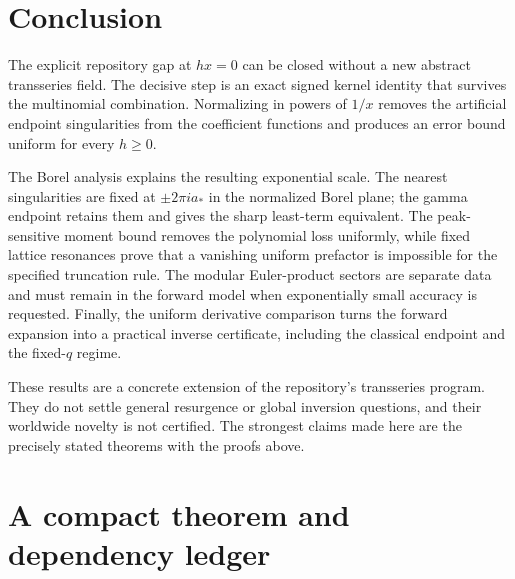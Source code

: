 \documentclass[11pt,a4paper]{article}
\numberwithin{equation}{section}
\theoremstyle{definition}\newtheorem{definition}[theorem]{Definition}
\theoremstyle{remark}\newtheorem{remark}[theorem]{Remark}
\begin{document}
\section{Conclusion}

The explicit repository gap at $hx=0$ can be closed without a new abstract
transseries field. The decisive step is an exact signed kernel identity that
survives the multinomial combination. Normalizing in powers of $1/x$ removes
the artificial endpoint singularities from the coefficient functions and
produces an error bound uniform for every $h\ge0$.

The Borel analysis explains the resulting exponential scale. The nearest
singularities are fixed at $\pm2\pi i a_*$ in the normalized Borel plane;
the gamma endpoint retains them and gives the sharp least-term equivalent.
The peak-sensitive moment bound removes the polynomial loss uniformly, while
fixed lattice resonances prove that a vanishing uniform prefactor is
impossible for the specified truncation rule. The modular Euler-product sectors are separate data and must remain in the
forward model when exponentially small accuracy is requested. Finally, the
uniform derivative comparison turns the forward expansion into a practical
inverse certificate, including the classical endpoint and the fixed-$q$
regime.

These results are a concrete extension of the repository's transseries
program. They do not settle general resurgence or global inversion questions,
and their worldwide novelty is not certified. The strongest claims made here
are the precisely stated theorems with the proofs above.

\appendix
\section{A compact theorem and dependency ledger}
\end{document}

